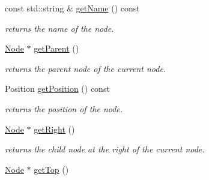 \begin{DoxyCompactItemize}
\item 
\mbox{\label{class_open_chams_1_1_node_a3fd7335faa33dce2f87c7e50eef3e294}} 
const std\+::string \& \mbox{\hyperlink{class_open_chams_1_1_node_a3fd7335faa33dce2f87c7e50eef3e294}{get\+Name}} () const
\begin{DoxyCompactList}\small\item\em returns the name of the node. \end{DoxyCompactList}\item 
\mbox{\label{class_open_chams_1_1_node_afa302489ba7f4c55c5de696773c3d57b}} 
\mbox{\hyperlink{class_open_chams_1_1_node}{Node}} $\ast$ \mbox{\hyperlink{class_open_chams_1_1_node_afa302489ba7f4c55c5de696773c3d57b}{get\+Parent}} ()
\begin{DoxyCompactList}\small\item\em returns the parent node of the current node. \end{DoxyCompactList}\item 
\mbox{\label{class_open_chams_1_1_node_a566f4d0bebb46cfd31384a8394a7dbb9}} 
Position \mbox{\hyperlink{class_open_chams_1_1_node_a566f4d0bebb46cfd31384a8394a7dbb9}{get\+Position}} () const
\begin{DoxyCompactList}\small\item\em returns the position of the node. \end{DoxyCompactList}\item 
\mbox{\label{class_open_chams_1_1_node_a9533ddcf078ddfc2a4e9bd9ffafa51cb}} 
\mbox{\hyperlink{class_open_chams_1_1_node}{Node}} $\ast$ \mbox{\hyperlink{class_open_chams_1_1_node_a9533ddcf078ddfc2a4e9bd9ffafa51cb}{get\+Right}} ()
\begin{DoxyCompactList}\small\item\em returns the child node at the right of the current node. \end{DoxyCompactList}\item 
\mbox{\label{class_open_chams_1_1_node_af59967a8c2d5a04ca0a58e2ef29bead1}} 
\mbox{\hyperlink{class_open_chams_1_1_node}{Node}} $\ast$ \mbox{\hyperlink{class_open_chams_1_1_node_af59967a8c2d5a04ca0a58e2ef29bead1}{get\+Top}} ()

\end{DoxyCompactItemize}
